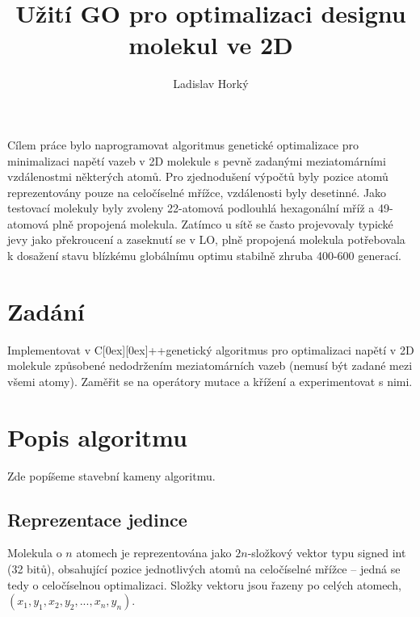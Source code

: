 \documentclass[journal]{IEEEtrancz}
\newcommand{\Cpp}{C\raisebox{0.15ex}[0ex][0ex]{++}}
\begin{document}
\title{Užití GO pro optimalizaci designu molekul ve 2D}
\author{Ladislav Horký}

\maketitle

\begin{abstrakt}
Cílem práce bylo naprogramovat algoritmus genetické optimalizace pro minimalizaci napětí vazeb v 2D molekule s pevně zadanými meziatomárními vzdálenostmi některých atomů. Pro zjednodušení výpočtů byly pozice atomů reprezentovány pouze na celočíselné mřížce, vzdálenosti byly desetinné. Jako testovací molekuly byly zvoleny 22-atomová podlouhlá hexagonální mříž a 49-atomová plně propojená molekula. Zatímco u sítě se často projevovaly typické jevy jako překroucení a zaseknutí se v LO, plně propojená molekula potřebovala k dosažení stavu blízkému globálnímu optimu stabilně zhruba 400-600 generací.

\end{abstrakt}

\IEEEpeerreviewmaketitle

\section{Zadání}
Implementovat v \Cpp  genetický algoritmus pro optimalizaci napětí v 2D molekule způsobené nedodržením meziatomárních vazeb (nemusí být zadané mezi všemi atomy). Zaměřit se na operátory mutace a křížení a experimentovat s nimi.


\section{Popis algoritmu}
Zde popíšeme stavební kameny algoritmu.

\subsection{Reprezentace jedince}
Molekula o $n$ atomech je reprezentována jako $2n$-složkový vektor typu signed int (32 bitů), obsahující pozice jednotlivých atomů na celočíselné mřížce -- jedná se tedy o celočíselnou optimalizaci. Složky vektoru jsou řazeny po celých atomech,  $(x_1,y_1,x_2,y_2,...,x_n,y_n)$.
\end{document}
